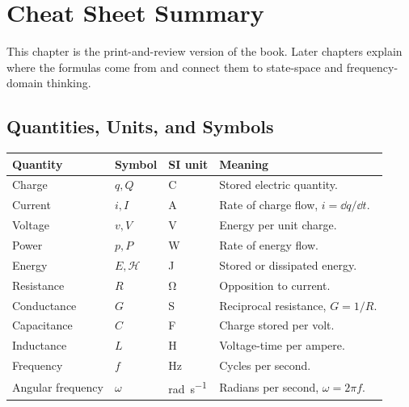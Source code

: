 \chapter{Cheat Sheet Summary}
This chapter is the print-and-review version of the book. Later chapters explain
where the formulas come from and connect them to state-space and
frequency-domain thinking.

\section{Quantities, Units, and Symbols}
\begin{tabularx}{\textwidth}{@{}L{0.19\textwidth}L{0.13\textwidth}L{0.16\textwidth}Y@{}}
\toprule
Quantity & Symbol & SI unit & Meaning \\
\midrule
Charge & \(q,Q\) & \si{\coulomb} & Stored electric quantity. \\
Current & \(i,I\) & \si{\ampere} & Rate of charge flow, \(i=\dd q/\dd t\). \\
Voltage & \(v,V\) & \si{\volt} & Energy per unit charge. \\
Power & \(p,P\) & \si{\watt} & Rate of energy flow. \\
Energy & \(E,\mathcal{H}\) & \si{\joule} & Stored or dissipated energy. \\
Resistance & \(R\) & \si{\ohm} & Opposition to current. \\
Conductance & \(G\) & \si{\siemens} & Reciprocal resistance, \(G=1/R\). \\
Capacitance & \(C\) & \si{\farad} & Charge stored per volt. \\
Inductance & \(L\) & \si{\henry} & Voltage-time per ampere. \\
Frequency & \(f\) & \si{\hertz} & Cycles per second. \\
Angular frequency & \(\omega\) & \si{\radian\per\second} & Radians per second, \(\omega=2\pi f\). \\
\bottomrule
\end{tabularx}

